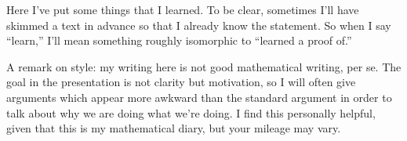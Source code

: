 Here I've put some things that I learned. To be clear, sometimes I'll have skimmed a text in advance so that I already know the statement. So when I say ``learn,'' I'll mean something roughly isomorphic to ``learned a proof of.''

A remark on style: my writing here is not good mathematical writing, per se. The goal in the presentation is not clarity but motivation, so I will often give arguments which appear more awkward than the standard argument in order to talk about why we are doing what we're doing. I find this personally helpful, given that this is my mathematical diary, but your mileage may vary.
